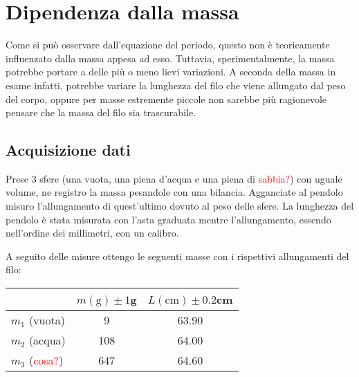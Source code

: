 \documentclass{article}
\begin{document}
	
	
	
	
	
	
	\newpage
	\section{Dipendenza dalla massa}
	Come si può osservare dall'equazione del periodo, questo non è teoricamente influenzato dalla massa appesa ad esso. Tuttavia, sperimentalmente, la massa potrebbe portare a delle più o meno lievi variazioni. A seconda della massa in esame infatti, potrebbe variare la lunghezza del filo che viene allungato dal peso del corpo, oppure per masse estremente piccole non sarebbe più ragionevole pensare che la massa del filo sia trascurabile.
	
	
	
	\subsection{Acquisizione dati}
	Prese 3 sfere (una vuota, una piena d'acqua e una piena di \textcolor{red}{sabbia?}) con uguale volume, ne registro la massa pesandole con una bilancia. Agganciate al pendolo misuro l'allungamento di quest'ultimo dovuto al peso delle sfere. La lunghezza del pendolo è stata misurata con l'asta graduata mentre l'allungamento, essendo nell'ordine dei millimetri, con un calibro. 
	
	A seguito delle misure ottengo le seguenti masse con i rispettivi allungamenti del filo:
	
	\vspace{0.5cm}
	\begin{table}[H]
		\centering
		\begin{tabular}{@{}lcc@{}}
				& \multicolumn{1}{l}{$m(\text{g}) \pm 1$g} & \multicolumn{1}{l}{$L(\text{cm}) \pm 0.2$cm}  \\ \midrule
			$m_1$ (vuota)   & 9& 63.90                                            \\
			$m_2$ (acqua)  & 108 & 64.00                                          \\
			$m_3$ (\textcolor{red}{cosa?})  & 647  & 64.60                                        \\ \bottomrule
		\end{tabular}
	\end{table}
	\vspace{0.5cm}
	
\end{document}
